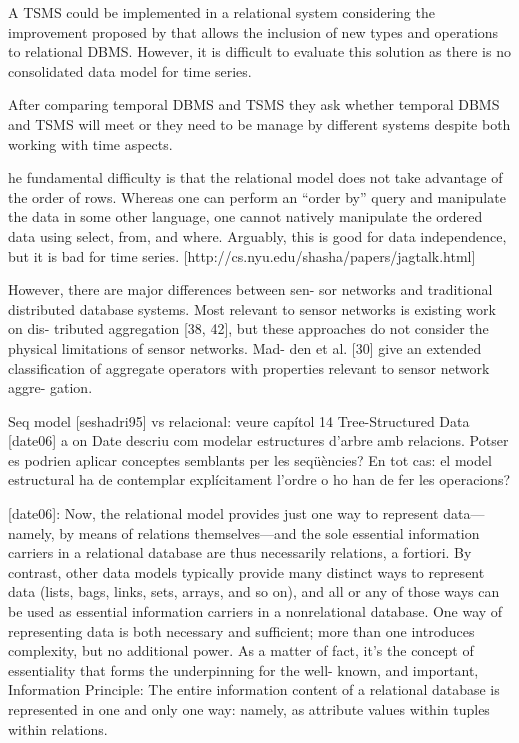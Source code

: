 A TSMS could be implemented in a relational system considering the improvement proposed by \textcite{stonebraker86} that allows the inclusion of new types and operations to relational DBMS. However, it is difficult to evaluate this solution as there is no consolidated data model  for time series. 

After comparing temporal DBMS and TSMS \parencite{schmidt95} they ask whether temporal DBMS and TSMS will meet or they need to be manage by different systems despite both working with time aspects.


he fundamental difficulty is that the relational model does not take advantage of the order of rows. Whereas one can perform an ``order by'' query and manipulate the data in some other language, one cannot natively manipulate the ordered data using select, from, and where. 
Arguably, this is good for data independence, but it is bad for time series.
[http://cs.nyu.edu/shasha/papers/jagtalk.html]

        However, there are major differences between sen-
sor networks and traditional distributed database systems.
Most relevant to sensor networks is existing work on dis-
tributed aggregation [38, 42], but these approaches do not
consider the physical limitations of sensor networks. Mad-
den et al. [30] give an extended classification of aggregate
operators with properties relevant to sensor network aggre-
gation. %


Seq model [seshadri95] vs relacional: veure capítol 14 Tree-Structured Data [date06] a on Date descriu com modelar estructures d'arbre amb relacions. Potser es podrien aplicar conceptes semblants per les seqüències? En tot cas: el model estructural ha de contemplar explícitament l'ordre o ho han de fer les operacions?

[date06]:
                                                Now, the relational model provides just one way to
represent data—namely, by means of relations themselves—and the sole essential information
carriers in a relational database are thus necessarily relations, a fortiori. By contrast, other data
models typically provide many distinct ways to represent data (lists, bags, links, sets, arrays,
and so on), and all or any of those ways can be used as essential information carriers in a
nonrelational database. One way of representing data is both necessary and sufficient; more
than one introduces complexity, but no additional power.
     As a matter of fact, it’s the concept of essentiality that forms the underpinning for the well-
known, and important, Information Principle:
     The entire information content of a relational database is represented in one and only
     one way: namely, as attribute values within tuples within relations.

